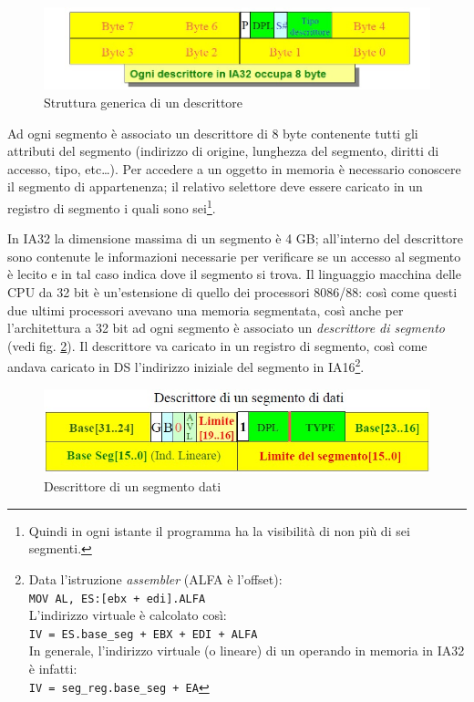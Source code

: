 \begin{figure}[!h]
\centering
\includegraphics[width=0.75\columnwidth]{img/descrittoreGenerico}
\caption{Struttura generica di un descrittore}
\label{fig:descrittoreGenerico}
\end{figure}

Ad ogni segmento è associato un descrittore di 8 byte contenente tutti gli attributi del segmento (indirizzo di origine, lunghezza del segmento, diritti di accesso, tipo, etc\ldots). Per accedere a un oggetto in memoria è necessario conoscere il segmento di appartenenza; il relativo selettore deve essere caricato in un registro di segmento i quali sono sei\footnote{Quindi in ogni istante il programma ha la visibilità di non più di sei segmenti.}.

In IA32 la dimensione massima di un segmento è 4 GB; all'interno del descrittore sono contenute le informazioni necessarie per verificare se un accesso al segmento è lecito e in tal caso indica dove il segmento si trova.
Il linguaggio macchina delle CPU da 32 bit è un'estensione di quello dei processori 8086/88: così come questi due ultimi processori avevano una memoria segmentata, così anche per l'architettura a 32 bit ad ogni segmento è associato un \textit{descrittore di segmento} (vedi fig. \ref{fig:descrittoreSegDati}). Il descrittore va caricato in un registro di segmento, così come andava caricato in DS l'indirizzo iniziale del segmento in IA16\footnote{Data l'istruzione \textit{assembler} (ALFA è l'offset):\\
\texttt{MOV AL, ES:[ebx + edi].ALFA }\\
L'indirizzo virtuale è calcolato così:\\
\texttt{IV = ES.base\_seg + EBX + EDI + ALFA}\\
In generale, l'indirizzo virtuale (o lineare) di un operando in memoria in IA32 è infatti:\\
\texttt{IV = seg\_reg.base\_seg + EA}}.

\begin{figure}[!h]
\centering
\includegraphics[width=0.75\columnwidth]{img/descrittoreSegDati}
\caption{Descrittore di un segmento dati}
\label{fig:descrittoreSegDati}
\end{figure}

